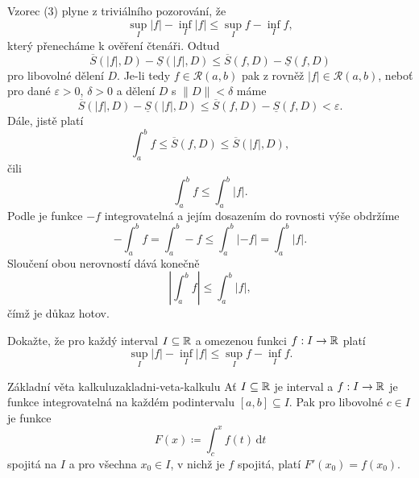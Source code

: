 \begin{thmproof}
 Vzorec (3) plyne z triviálního pozorování, že
 \[
  \sup_I |f| - \inf_I |f| \leq \sup_I f - \inf_I f,
 \]
 který přenecháme k ověření čtenáři. Odtud
 \[
  \overline{S}(|f|,D) - \underline{S}(|f|,D) \leq \overline{S}(f,D) -
  \underline{S}(f,D)
 \]
 pro libovolné dělení $D$. Je-li tedy $f \in \mathcal{R}(a,b)$ pak z
  rovněž $|f| \in
 \mathcal{R}(a,b)$, neboť pro dané $\varepsilon>0$, $\delta>0$ a dělení $D$ s
 $\|D\|< \delta$ máme
 \[
  \overline{S}(|f|,D) - \underline{S}(|f|,D) \leq \overline{S}(f,D) -
  \underline{S}(f,D) < \varepsilon.
 \]
 Dále, jistě platí
 \[
  \int_{a}^{b} f \leq \overline{S}(f,D) \leq \overline{S}(|f|,D),
 \]
 čili
 \[
  \int_{a}^{b} f \leq \int_{a}^{b} |f|.
 \]
 Podle  je funkce $-f$
 integrovatelná a jejím dosazením do rovnosti výše obdržíme
 \[
  - \int_{a}^{b} f = \int_{a}^{b} -f \leq \int_{a}^{b} |-f| = \int_{a}^{b} |f|.
 \]
 Sloučení obou nerovností dává konečně
 \[
  \left| \int_{a}^{b} f \right| \leq \int_{a}^{b} |f|,
 \]
 čímž je důkaz hotov.
\end{thmproof}

\begin{exercise}{}{}
 Dokažte, že pro každý interval $I \subseteq \mathbb{R}$ a omezenou funkci $f:I \to \mathbb{R}$
 platí
 \[
  \sup_I |f| - \inf_I |f| \leq \sup_I f - \inf_I f.
 \]
\end{exercise}

\begin{theorem}{Základní věta kalkulu}{zakladni-veta-kalkulu}
 Ať $I \subseteq \mathbb{R}$ je interval a $f:I \to \mathbb{R}$ je funkce integrovatelná na
 každém podintervalu $[a,b] \subseteq I$. Pak pro libovolné $c \in I$ je funkce
 \[
  F(x) \coloneqq \int_{c}^{x} f(t) \, \mathrm{d}t
 \]
 spojitá na $I$ a pro všechna $x_0 \in I$, v nichž je $f$ spojitá, platí
 $F'(x_0) = f(x_0)$.
\end{theorem}

